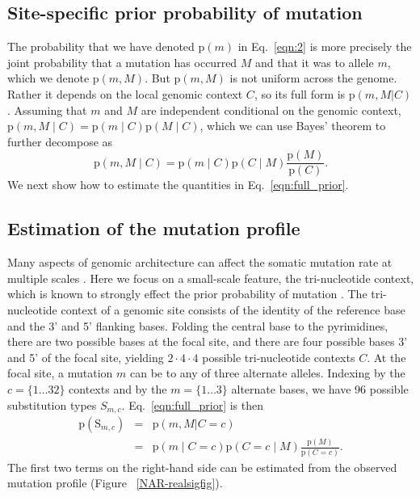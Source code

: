 \documentclass[a4,center,fleqn]{NAR}
\begin{document}
\subsection{Site-specific prior probability of mutation}
The probability that we have denoted $\mathrm{p}(m)$ in Eq.~\ref{eqn:2} is more precisely the joint probability that a mutation has occurred $M$ and that it was to allele $m$, which we denote $\mathrm{p}(m,M)$.
But $\mathrm{p}(m,M)$ is not uniform across the genome.
Rather it depends on the local genomic context $C$, so its full form is $\mathrm{p}(m,M | C)$ \cite{Buisson2019}.
Assuming that $m$ and $M$ are independent conditional on the genomic context, $\mathrm{p}(m,M \mid C) = \mathrm{p}(m \mid C) \mathrm{p}(M \mid C)$, which we can use Bayes' theorem to further decompose as 
\begin{equation}
  \label{eqn:full_prior}
  \mathrm{p}(m,M \mid C) = \mathrm{p}(m \mid C) \mathrm{p}(C \mid M)\frac{\mathrm{p}(M)}{\mathrm{p}(C)}.
\end{equation}
We next show how to estimate the quantities in Eq.~\ref{eqn:full_prior}.

\subsection{Estimation of the mutation profile}
Many aspects of genomic architecture can affect the somatic mutation rate at multiple scales \cite{Buisson2019}.
Here we focus on a small-scale feature, the tri-nucleotide context, which is known to strongly effect the prior probability of mutation \citep{Nik-Zainal2012a,Alexandrov2015,Lee-Six2018}.
The tri-nucleotide context of a genomic site consists of the identity of the reference base and the 3' and 5' flanking bases.
Folding the central base to the pyrimidines, there are two possible bases at the focal site, and there are four possible bases 3' and 5' of the focal site, yielding $2 \cdot 4 \cdot 4$ possible tri-nucleotide contexts $C$.
At the focal site, a mutation $m$ can be to any of three alternate alleles.
Indexing by the $c=\{1 \dots 32\}$ contexts and by the $m = \{1 \dots 3\}$ alternate bases, we have 96 possible substitution types $S_{m,c}$.
Eq.~\ref{eqn:full_prior} is then
\begin{equation}
  \label{eqn:detailed_prior}
  \begin{array}{rcl}
  \mathrm{p}(\mathrm{S}_{m,c}) &=&  \mathrm{p}(m, M | C = c) \\
                            &=& \mathrm{p}(m \mid C = c) \mathrm{p}(C = c \mid M)\frac{\mathrm{p}(M)}{\mathrm{p}(C = c)}.
  \end{array}
\end{equation}
The first two terms on the right-hand side can be estimated from the observed mutation profile (Figure ~\ref{NAR-realsigfig}).
\end{document}
